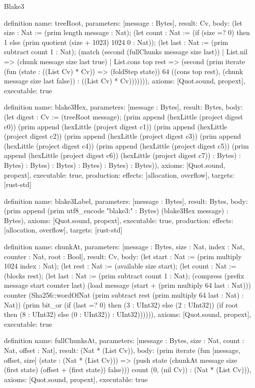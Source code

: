 \begin{lexlean}{Blake3}
\begin{semanticmodule}
definition{
  name: treeRoot,
  parameters: [message : Bytes],
  result: Cv,
  body: (let size : Nat := (prim length message : Nat); (let count : Nat := (if (size =? 0) then 1 else (prim quotient (size + 1023) 1024 0 : Nat)); (let last : Nat := (prim subtract count 1 : Nat); (match (second (fullChunks message size last))
    | List.nil => (chunk message size last true)
    | List.cons top rest => (second (prim iterate (fun (state : ((List Cv) * Cv)) => (foldStep state)) 64 ((cons top rest), (chunk message size last false)) : ((List Cv) * Cv))))))),
  axioms: [Quot.sound, propext],
  executable: true
}

definition{
  name: blake3Hex,
  parameters: [message : Bytes],
  result: Bytes,
  body: (let digest : Cv := (treeRoot message); (prim append (hexLittle (project digest c0)) (prim append (hexLittle (project digest c1)) (prim append (hexLittle (project digest c2)) (prim append (hexLittle (project digest c3)) (prim append (hexLittle (project digest c4)) (prim append (hexLittle (project digest c5)) (prim append (hexLittle (project digest c6)) (hexLittle (project digest c7)) : Bytes) : Bytes) : Bytes) : Bytes) : Bytes) : Bytes) : Bytes)),
  axioms: [Quot.sound, propext],
  executable: true,
  production: {effects: [allocation, overflow], targets: [rust-std]}
}

definition{
  name: blake3Label,
  parameters: [message : Bytes],
  result: Bytes,
  body: (prim append (prim utf8_encode "blake3:" : Bytes) (blake3Hex message) : Bytes),
  axioms: [Quot.sound, propext],
  executable: true,
  production: {effects: [allocation, overflow], targets: [rust-std]}
}

definition{
  name: chunkAt,
  parameters: [message : Bytes, size : Nat, index : Nat, counter : Nat, root : Bool],
  result: Cv,
  body: (let start : Nat := (prim multiply 1024 index : Nat); (let rest : Nat := (available size start); (let count : Nat := (blocks rest); (let last : Nat := (prim subtract count 1 : Nat); (compress (prefix message start counter last) (load message (start + (prim multiply 64 last : Nat))) counter (Sha256::wordOfNat (prim subtract rest (prim multiply 64 last : Nat) : Nat)) (prim bit_or (if (last =? 0) then (3 : UInt32) else (2 : UInt32)) (if root then (8 : UInt32) else (0 : UInt32)) : UInt32)))))),
  axioms: [Quot.sound, propext],
  executable: true
}

definition{
  name: fullChunksAt,
  parameters: [message : Bytes, size : Nat, count : Nat, offset : Nat],
  result: (Nat * (List Cv)),
  body: (prim iterate (fun [message, offset, size] (state : (Nat * (List Cv))) => (push state (chunkAt message size (first state) (offset + (first state)) false))) count (0, (nil Cv)) : (Nat * (List Cv))),
  axioms: [Quot.sound, propext],
  executable: true
}


\end{semanticmodule}
\end{lexlean}
